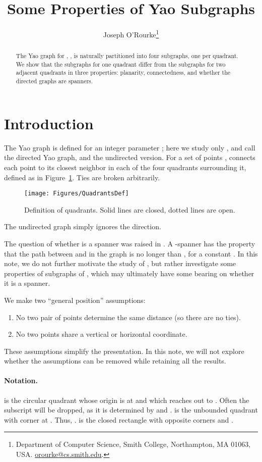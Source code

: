 \pdfoutput=1  \documentclass[]{article}
\title{Some Properties of Yao  Subgraphs}
\author{Joseph O'Rourke\thanks{Department of Computer Science, Smith College, Northampton, MA
      01063, USA.
      \protect\url{orourke@cs.smith.edu}.}
}
\newcommand{\figlab}[1]{\label{fig:#1}}
\newcommand{\figref}[1]{\ref{fig:#1}}
\begin{document}
\maketitle

\begin{abstract}
The Yao graph for , , 
is naturally partitioned into four subgraphs, one per quadrant.
We show that the subgraphs for one quadrant differ from the subgraphs for
two adjacent quadrants in three properties:
planarity, connectedness, and whether the directed graphs are spanners.
\end{abstract}


\section{Introduction}
The Yao graph is defined for an integer parameter ;
here we study only , and call
 the directed Yao graph, and  the undirected version.
For a set of points ,  connects each point
to its closest neighbor in each of the four quadrants surrounding it,
defined as in
Figure~\figref{QuadrantsDefinition}.
Ties are broken arbitrarily.
\begin{figure}[htbp]
\centering
\texttt{[image: Figures/QuadrantsDef]}
\caption{Definition of quadrants. Solid lines are closed, dotted lines are open.}
\figlab{QuadrantsDefinition}
\end{figure}
The undirected graph  simply ignores the direction.

The question of whether  is a spanner was raised in
\cite{sppyg-dmp-09}.
A -spanner has the property that the path between  and  in the
graph is no longer than , for a constant .
In this note, we do not further motivate the study of ,
but rather investigate some properties of subgraphs of , which
may ultimately have some bearing on whether it is a spanner.

We make two ``general position'' assumptions:
\begin{enumerate}
\item No two pair of points determine the same distance
(so there are no ties).
\item
No two points share a vertical or horizontal coordinate.
\end{enumerate}
These assumptions simplify the presentation.
In this note, we will not explore whether the assumptions can be removed while retaining
all the results.

\paragraph{Notation.}
 is the circular quadrant whose origin is at  and which reaches out to .
Often the subscript  will be dropped, as it is determined by  and .
 is the unbounded quadrant with corner at .
Thus,
.
 is the closed rectangle with opposite corners  and .
\end{document}
